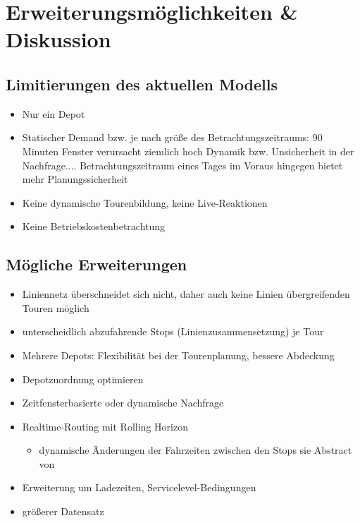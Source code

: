 \chapter{Erweiterungsmöglichkeiten \& Diskussion}
\label{chapter:6}
\section{Limitierungen des aktuellen Modells}
\begin{itemize}
    \item Nur ein Depot
    \item Statischer Demand bzw. je nach größe des Betrachtungszeitraums: 90 Minuten Fenster verursacht ziemlich hoch Dynamik bzw. Unsicherheit in der Nachfrage.... Betrachtungszeitraum eines Tages im Voraus hingegen bietet mehr Planungssicherheit
    \item Keine dynamische Tourenbildung, keine Live-Reaktionen
    \item Keine Betriebskostenbetrachtung
\end{itemize}

\section{Mögliche Erweiterungen}
\begin{itemize}
    \item Liniennetz überschneidet sich nicht, daher auch keine Linien übergreifenden Touren möglich
    \item unterscheidlich abzufahrende Stops (Linienzusammensetzung) je Tour
    \item Mehrere Depots: Flexibilität bei der Tourenplanung, bessere Abdeckung
    \item Depotzuordnung optimieren
    \item Zeitfensterbasierte oder dynamische Nachfrage
    \item Realtime-Routing mit Rolling Horizon
    \begin{itemize}
        \item dynamische Änderungen der Fahrzeiten zwischen den Stops sie Abstract von \textcite{lian_-demand_2023} 
    \end{itemize}
    \item Erweiterung um Ladezeiten, Servicelevel-Bedingungen
    \item größerer Datensatz
\end{itemize}

